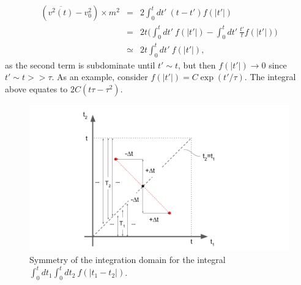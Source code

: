 \begin{eqnarray}
(\overline{v^2(t)}-v_0^2) \times m^2 &=& 2 \int_{0}^{t} dt'~ (t-t')f(|t'|) \\
&=& 2 t \bigg( \int_{0}^{t} dt'~ f(|t'|) - \int_{0}^{t} dt'~ \frac{t'}{t} f(|t'|)\bigg)\\
& \simeq & 2t \int_{0}^{t} dt'~ f(|t'|),
\end{eqnarray}
as the second term is subdominate until $t'\sim t$, but then $f(|t'|) \rightarrow 0$ since $t'\sim t>>\tau$. As an example, consider $f(|t'|)=C \exp(t'/\tau)$. The integral above equates to $2C(t \tau - \tau^2)$.
\begin{figure}[h]
\includegraphics[width=16cm]{fig_problem_3p3.png}
    \caption{Symmetry of the integration domain for the integral $ \int_{0}^{t} dt_1 \int_{0}^{t} dt_2 ~ f(|t_1-t_2|)$.}
    \label{fig:3p3}
\end{figure}
